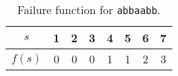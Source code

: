 \begin{table}[!ht]
    \centering
    \begin{tabular}{|c||c|c|c|c|c|c|c|}
        \hline
        $s$ & 1 & 2 & 3 & 4 & 5 & 6 & 7 \\
        \hline
        $f(s)$ & 0 & 0 & 0 & 1 & 1 & 2 & 3 \\
        \hline
    \end{tabular}
    \caption{Failure function for \texttt{abbaabb}.}
    \label{tab:030403c}
\end{table}